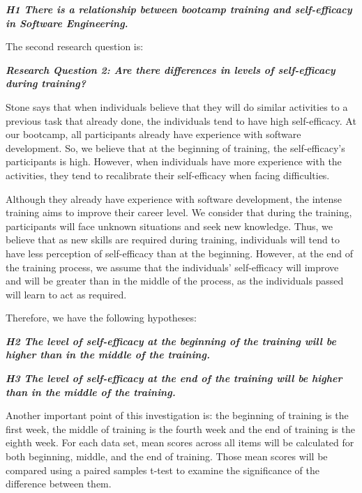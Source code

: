 \documentclass[10pt, conference]{IEEEtran}
\begin{document}
\textbf{\textit{H1 There is a relationship between bootcamp training and self-efficacy in Software Engineering.}}
 \newline
   
The second research question is:
 \newline
 
\textbf{\textit{Research Question 2:  Are there differences in levels of self-efficacy during training?}}   
 \newline
 
 Stone \cite{stone1994overconfidence} says that when individuals believe that they will do similar activities to a previous task that already done, the individuals tend to have high self-efficacy. At our bootcamp, all participants already have experience with software development. So, we believe that at the beginning of training, the self-efficacy's participants is high. However, when individuals have more experience with the activities, they tend to recalibrate their self-efficacy when facing difficulties.

Although they already have experience with software development, the intense training aims to improve their career level. We consider that during the training, participants will face unknown situations and seek new knowledge. Thus, we believe that as new skills are required during training, individuals will tend to have less perception of self-efficacy than at the beginning. However, at the end of the training process, we assume that the individuals' self-efficacy will improve and will be greater than in the middle of the process, as the individuals passed will learn to act as required.

Therefore, we have the following hypotheses:
 \newline

\textbf{\textit{H2 The level of self-efficacy at the beginning of the training will be higher than in the middle of the training.}} \newline

\textbf{\textit{H3 The level of self-efficacy at the end of the training will be higher than in the middle of the training.}}
 \newline


Another important point of this investigation is: the beginning of training is the first week, the middle of training is the fourth week and the end of training is the eighth week. For each data set, mean scores across all items will be calculated for both beginning, middle, and the end of training. Those mean scores will be compared using a paired samples t-test to examine the significance of the difference between them. 
\end{document}
